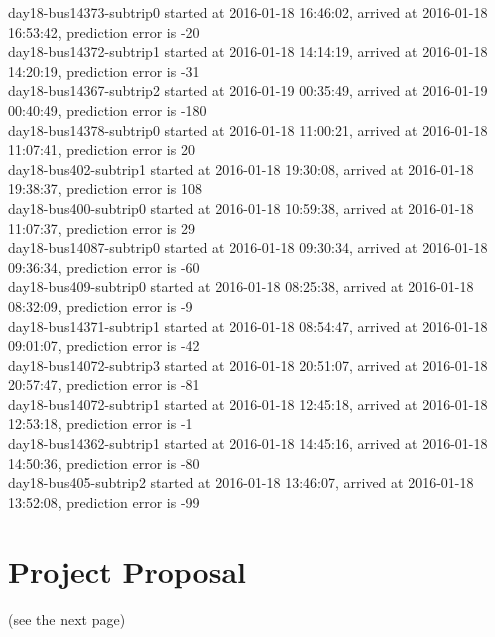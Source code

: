\documentclass[12pt,a4paper,oneside,openright]{report}
\begin{document}
{day18-bus14373-subtrip0 started at 2016-01-18 16:46:02, arrived at 2016-01-18 16:53:42, prediction error is -20 \\
day18-bus14372-subtrip1 started at 2016-01-18 14:14:19, arrived at 2016-01-18 14:20:19, prediction error is -31 \\
day18-bus14367-subtrip2 started at 2016-01-19 00:35:49, arrived at 2016-01-19 00:40:49, prediction error is -180 \\
day18-bus14378-subtrip0 started at 2016-01-18 11:00:21, arrived at 2016-01-18 11:07:41, prediction error is 20 \\
day18-bus402-subtrip1 started at 2016-01-18 19:30:08,    arrived at 2016-01-18 19:38:37, prediction error is 108 \\
day18-bus400-subtrip0 started at 2016-01-18 10:59:38,    arrived at 2016-01-18 11:07:37, prediction error is 29 \\
day18-bus14087-subtrip0 started at 2016-01-18 09:30:34, arrived at 2016-01-18 09:36:34, prediction error is -60 \\
day18-bus409-subtrip0 started at 2016-01-18 08:25:38,    arrived at 2016-01-18 08:32:09, prediction error is -9 \\
day18-bus14371-subtrip1 started at 2016-01-18 08:54:47, arrived at 2016-01-18 09:01:07, prediction error is -42 \\
day18-bus14072-subtrip3 started at 2016-01-18 20:51:07, arrived at 2016-01-18 20:57:47, prediction error is -81 \\
day18-bus14072-subtrip1 started at 2016-01-18 12:45:18, arrived at 2016-01-18 12:53:18, prediction error is -1 \\
day18-bus14362-subtrip1 started at 2016-01-18 14:45:16, arrived at 2016-01-18 14:50:36, prediction error is -80 \\
day18-bus405-subtrip2 started at 2016-01-18 13:46:07,    arrived at 2016-01-18 13:52:08, prediction error is -99 \\
}


\chapter{Project Proposal}
(see the next page)


\end{document}
